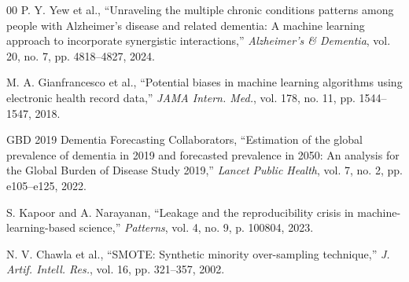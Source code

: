 \documentclass[preprint,12pt]{elsarticle}
\begin{document}
\begin{thebibliography}{00}
 P. Y. Yew et al., ``Unraveling the multiple chronic conditions patterns among people with Alzheimer's disease and related dementia: A machine learning approach to incorporate synergistic interactions,'' \textit{Alzheimer's \& Dementia}, vol. 20, no. 7, pp. 4818--4827, 2024.

 M. A. Gianfrancesco et al., ``Potential biases in machine learning algorithms using electronic health record data,'' \textit{JAMA Intern. Med.}, vol. 178, no. 11, pp. 1544--1547, 2018.

 GBD 2019 Dementia Forecasting Collaborators, ``Estimation of the global prevalence of dementia in 2019 and forecasted prevalence in 2050: An analysis for the Global Burden of Disease Study 2019,'' \textit{Lancet Public Health}, vol. 7, no. 2, pp. e105--e125, 2022.

 S. Kapoor and A. Narayanan, ``Leakage and the reproducibility crisis in machine-learning-based science,'' \textit{Patterns}, vol. 4, no. 9, p. 100804, 2023.

 N. V. Chawla et al., ``SMOTE: Synthetic minority over-sampling technique,'' \textit{J. Artif. Intell. Res.}, vol. 16, pp. 321--357, 2002.

\end{thebibliography}
\end{document}
